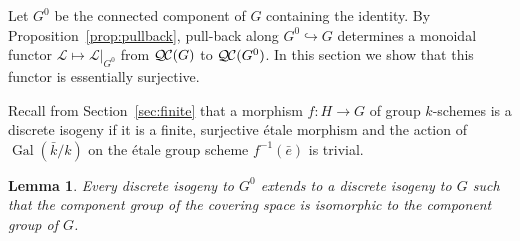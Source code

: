\documentclass[11pt]{amsart}
\theoremstyle{plain}
\newtheorem{lemma}[theorem]{Lemma}
\theoremstyle{definition}
\theoremstyle{remark}
\newcommand{\bFq}{\bar{k}}
\newcommand{\Fq}{k}
\DeclareMathOperator{\Gal}{Gal}
\newcommand{\qcs}[1]{{\mathcal{#1}}}
\newcommand{\QC}{{\mathcal{Q\hskip-0.8pt C}}}
\begin{document}
Let $G^0$ be the connected component of $G$ containing the identity.
By Proposition~\ref{prop:pullback}, pull-back along
$G^0\hookrightarrow G$ determines a monoidal functor
$\qcs{L}\mapsto \qcs{L}\vert_{G^0}$ from $\QC(G)$ to $\QC(G^0)$.  In
this section we show that this functor is essentially surjective. 

Recall from Section~\ref{sec:finite} that 
a morphism $f : H\to G$ of group $\Fq$-schemes is a discrete isogeny 
if it is a finite, surjective \'etale morphism and 
the action of $\Gal(\bFq/\Fq)$ on the \'etale group scheme $f^{-1}({\bar e})$ is trivial.

\begin{lemma}\label{lemma:ext}
Every discrete isogeny  to $G^0$ extends to a discrete
isogeny to $G$ such that the component group of the covering space is isomorphic
to the component group of $G$.
\end{lemma}
\end{document}
